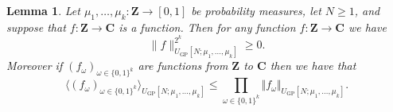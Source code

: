 \documentclass[11pt,reqno]{amsart}
\numberwithin{equation}{section}
\newtheorem{lemma}[theorem]{Lemma}
\theoremstyle{definition}
\theoremstyle{remark}
\newcommand{\snorm}[1]{\lVert#1\rVert}
\renewcommand{\le}{\leqslant}
\renewcommand{\ge}{\geqslant}
\newcommand\Z{\mathbf{Z}}
\newcommand\C{\mathbf{C}}
\newcommand\GP{\operatorname{GP}}
\begin{document}
\begin{lemma}\label{lem:GCS}
Let $\mu_1,\ldots,\mu_k : \Z \rightarrow [0,1]$ be probability measures, let $N\ge 1$, and suppose that $f : \Z \rightarrow \C$ is a function. Then for any function $f : \Z \rightarrow \C$ we have
\begin{equation}\label{GP-pos}\snorm{f}_{U_{\GP}[N;\mu_1,\ldots,\mu_k]}^{2^k} \ge 0.\end{equation}
Moreover if $(f_{\omega})_{\omega \in \{0,1\}^k}$ are functions from $\Z$ to $\C$ then we have that 
\begin{equation}\label{gpcs} \langle (f_{\omega})_{\omega \in \{0,1\}^k}\rangle_{U_{\GP}[N;\mu_1,\dots, \mu_k]} \le  \prod_{\omega \in \{0,1\}^k} \Vert f_{\omega} \Vert_{U_{\GP}[N;\mu_1,\dots, \mu_k]}.\end{equation}

\end{lemma}
\end{document}
